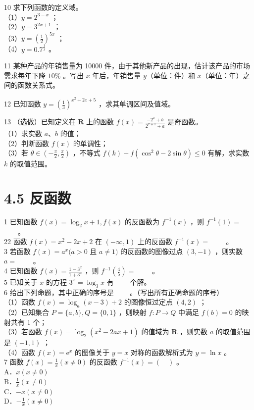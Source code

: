 \documentclass[10pt]{article}
\begin{document}
10 求下列函数的定义域。\\
（1）\(y=2^{3-x}\) ；\\
（2）\(y=3^{2 x+1}\) ；\\
（3）\(y=\left(\frac{1}{2}\right)^{5 x}\) ；\\
（4）\(y=0.7^{\frac{1}{x}}\) 。

11 某种产品的年销售量为 10000 件，由于其他新产品的出现，估计该产品的市场需求每年下降 \(10 \%\) 。写出 \(x\) 年后，年销售量 \(y\)（单位：件）和 \(x\)（单位：年）之间的函数关系式。

12 已知函数 \(y=\left(\frac{1}{3}\right)^{x^{2}+2 x+5}\) ，求其单调区间及值域。

13 （选做）已知定义在 \(\mathbf{R}\) 上的函数 \(f(x)=\frac{-2^{x}+b}{2^{x+1}+a}\) 是奇函数。\\
（1）求实数 \(a 、 b\) 的值；\\
（2）判断函数 \(f(x)\) 的单调性；\\
（3）若 \(\theta \in\left(-\frac{\pi}{2}, \frac{\pi}{2}\right)\) ，不等式 \(f(k)+f\left(\cos ^{2} \theta-2 \sin \theta\right) \leqslant 0\) 有解，求实数 \(k\) 的取值范围。

\section*{4.5 反函数}
1 已知函数 \(f(x)=\log _{2} x+1, f(x)\) 的反函数为 \(f^{-1}(x)\) ，则 \(f^{-1}(1)=\) \(\qquad\)。\\
22 函数 \(f(x)=x^{2}-2 x+2\) 在 \((-\infty, 1)\) 上的反函数 \(f^{-1}(x)=\) \(\qquad\)。\\
3 若函数 \(f(x)=a^{x}(a>0\) 且 \(a \neq 1)\) 的反函数的图像过点 \((3,-1)\) ，则实数 \(a=\) \(\qquad\)。\\
4 已知函数 \(f(x)=\frac{1-3^{x}}{1+3^{x}}\) ，则 \(f^{-1}\left(\frac{4}{5}\right)=\) \(\qquad\)。\\
5 已知关于 \(x\) 的方程 \(3^{x}=\log _{3} x\) 有 \(\qquad\)个解。\\
6 给出下列命题，其中正确的序号是 \(\qquad\)。（写出所有正确命题的序号）\\
（1）函数 \(f(x)=\log _{a}(x-3)+2\) 的图像恒过定点 \((4,2)\) ；\\
（2）已知集合 \(P=\{a, b\}, Q=\{0,1\}\) ，则映射 \(f: P \rightarrow Q\) 中满足 \(f(b)=0\) 的映射共有 1 个；\\
（3）若函数 \(f(x)=\log _{2}\left(x^{2}-2 a x+1\right)\) 的值域为 \(\mathbf{R}\) ，则实数 \(a\) 的取值范围是 \((-1,1)\) ；\\
（4）函数 \(f(x)=\mathrm{e}^{x}\) 的图像关于 \(y=x\) 对称的函数解析式为 \(y=\ln x\) 。\\
7 函数 \(f(x)=\frac{1}{x}(x \neq 0)\) 的反函数 \(f^{-1}(x)=(\quad)\) 。\\
A．\(x(x \neq 0)\)\\
B．\(\frac{1}{x}(x \neq 0)\)\\
C．\(-x(x \neq 0)\)\\
D．\(-\frac{1}{x}(x \neq 0)\)
\end{document}
